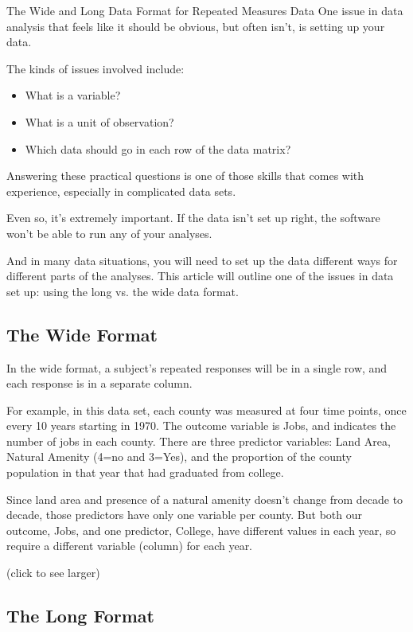 
The Wide and Long Data Format for Repeated Measures Data
One issue in data analysis that feels like it should be obvious, but often isn’t, is setting up your data.

The kinds of issues involved include:

\begin{itemize}
\item What is a variable?
\item What is a unit of observation?
\item Which data should go in each row of the data matrix?
\end{itemize}
Answering these practical questions is one of those skills that comes with experience, especially in complicated data sets.

Even so, it’s extremely important. If the data isn’t set up right, the software won’t be able to run any of your analyses.

And in many data situations, you will need to set up the data different ways for different parts of the analyses. This article will outline one of the issues in data set up: using the long vs. the wide data format.

\subsection{The Wide Format}

In the wide format, a subject’s repeated responses will be in a single row, and each response is in a separate column.

For example, in this data set, each county was measured at four time points, once every 10 years starting in 1970. The outcome variable is Jobs, and indicates the number of jobs in each county. There are three predictor variables: Land Area, Natural Amenity (4=no and 3=Yes), and the proportion of the county population in that year that had graduated from college.

Since land area and presence of a natural amenity doesn’t change from decade to decade, those predictors have only one variable per county. But both our outcome, Jobs, and one predictor, College, have different values in each year, so require a different variable (column) for each year.

(click to see larger)
\subsection{The Long Format}

